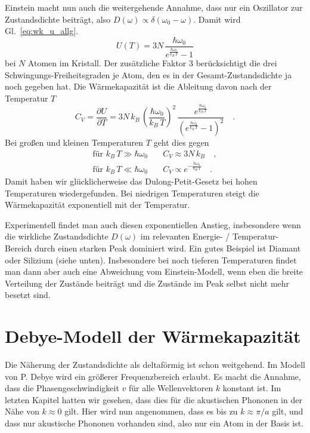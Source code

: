 Einstein macht nun auch die weitergehende Annahme, dass nur ein Oszillator zur  Zustandsdichte beiträgt, also $D(\omega) \propto \delta(\omega_0 - \omega)$. Damit wird Gl.~\ref{eq:wk_u_allg}.
\begin{equation}
U(T) =  3N \, \frac{\hbar \omega_0 }{e^{\frac{\hbar \omega_0}{k_B \, T} }- 1}
\end{equation}
bei $N$ Atomen im Kristall. Der zusätzliche Faktor 3 berücksichtigt die drei Schwingungs-Freiheitsgraden je Atom, den es in der Gesamt-Zustandsdichte ja noch gegeben hat. Die Wärmekapazität ist die Ableitung davon nach der Temperatur $T$
\begin{equation}
C_V = \frac{\partial U}{\partial T }  =3 N \, k_B \, 
\left( \frac{\hbar \omega_0}{k_B \, T} \right)^2 
\, \frac{e^{\frac{\hbar \omega_0}{k_B \, T} }}
{\left( e^{\frac{\hbar \omega_0}{k_B \, T} }- 1 \right)^2} \quad . \label{eq:wk_einstein_full}
\end{equation}
Bei großen und kleinen Temperaturen $T$ geht dies gegen
\begin{align}
\text{für } k_B \, T \gg \hbar \omega_0  \quad & C_V \approx 3 N \, k_B \quad , \\
\text{für } k_B \, T \ll \hbar \omega_0  \quad & C_V \propto e^{-\frac{\hbar \omega_0}{k_B \, T} } \quad .
\end{align}
Damit haben wir glücklicherweise das Dulong-Petit-Gesetz bei hohen Temperaturen wiedergefunden. Bei niedrigen Temperaturen steigt die Wärmekapazität exponentiell mit der Temperatur.

Experimentell findet man auch diesen exponentiellen Anstieg, insbesondere wenn die wirkliche Zustandsdichte $D(\omega)$ im relevanten Energie- / Temperatur-Bereich durch einen starken Peak dominiert wird. Ein gutes Beispiel ist Diamant oder Silizium (siehe unten). Insbesondere bei noch tieferen Temperaturen findet man dann aber auch eine Abweichung vom Einstein-Modell, wenn eben die breite Verteilung der Zustände beiträgt und die Zustände im Peak selbst nicht mehr besetzt sind.



\section{Debye-Modell der Wärmekapazität}

Die Näherung der Zustandsdichte als deltaförmig ist schon weitgehend. Im Modell von P. Debye wird ein größerer Frequenzbereich erlaubt. Es macht die Annahme, dass die Phasengeschwindigkeit $v$ für alle Wellenvektoren $k$ konstant ist. Im letzten Kapitel hatten wir gesehen, dass dies für die akustischen Phononen in der Nähe von $k \approx 0$ gilt. Hier wird nun angenommen, dass es bis zu $k \approx \pi / a$ gilt, und dass nur akustische Phononen vorhanden sind, also nur ein Atom in der Basis ist.

